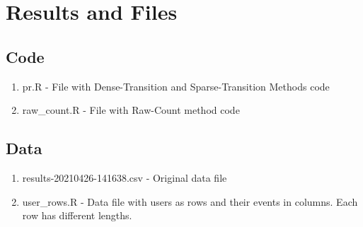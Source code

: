 \documentclass{article}
\begin{document}
      

\section{Results and Files}
\subsection{Code}
\begin{enumerate}
    \item pr.R - File with Dense-Transition and Sparse-Transition Methods code
    \item raw\_count.R - File with Raw-Count method code
\end{enumerate}


\subsection{Data}
\begin{enumerate}
    \item results-20210426-141638.csv - Original data file
    \item user\_rows.R - Data file with users as rows and their events in columns. Each row has different lengths.
\end{enumerate}
\end{document}
